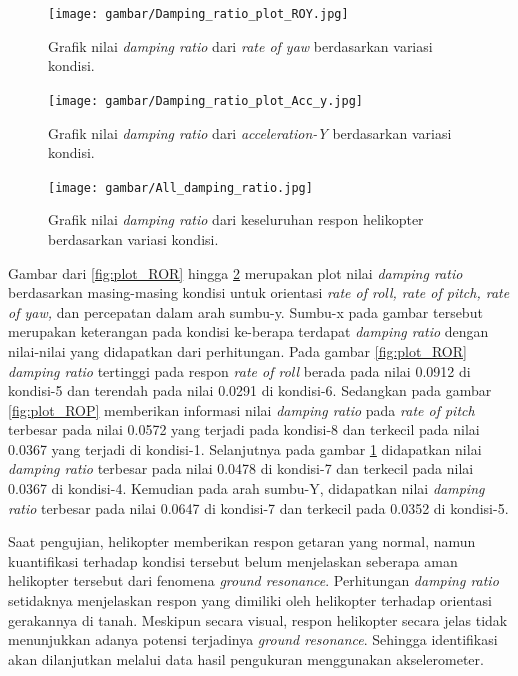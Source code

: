 \begin{figure}[h]
	\centering
	\texttt{[image: gambar/Damping\_ratio\_plot\_ROY.jpg]}
	\caption{Grafik nilai \textit{damping ratio} dari \textit{rate of yaw} berdasarkan variasi kondisi.}
	\label{fig:plot_ROY}
\end{figure}

\begin{figure}[h]
	\centering
	\texttt{[image: gambar/Damping\_ratio\_plot\_Acc\_y.jpg]}
	\caption{Grafik nilai \textit{damping ratio} dari \textit{acceleration-Y} berdasarkan variasi kondisi.}
	\label{fig:plot_Acc_Y}
\end{figure}

\begin{figure}[H]
	\centering
	\texttt{[image: gambar/All\_damping\_ratio.jpg]}
	\caption{Grafik nilai \textit{damping ratio} dari keseluruhan respon helikopter berdasarkan variasi kondisi.}
	\label{fig:plot_All}
\end{figure}

Gambar dari \ref{fig:plot_ROR} hingga \ref{fig:plot_Acc_Y} merupakan plot nilai \textit{damping ratio} berdasarkan masing-masing kondisi untuk orientasi \textit{rate of roll, rate of pitch, rate of yaw,} dan percepatan dalam arah sumbu-y. Sumbu-x pada gambar tersebut merupakan keterangan pada kondisi ke-berapa terdapat \textit{damping ratio} dengan nilai-nilai yang didapatkan dari perhitungan. Pada gambar \ref{fig:plot_ROR} \textit{damping ratio} tertinggi pada respon \textit{rate of roll} berada pada nilai 0.0912 di kondisi-5 dan terendah pada nilai 0.0291 di kondisi-6. Sedangkan pada gambar \ref{fig:plot_ROP} memberikan informasi nilai \textit{damping ratio} pada \textit{rate of pitch} terbesar pada nilai 0.0572 yang terjadi pada kondisi-8 dan terkecil pada nilai 0.0367 yang terjadi di kondisi-1. Selanjutnya pada gambar \ref{fig:plot_ROY} didapatkan nilai \textit{damping ratio} terbesar pada nilai 0.0478 di kondisi-7 dan terkecil pada nilai 0.0367 di kondisi-4. Kemudian pada arah sumbu-Y, didapatkan nilai \textit{damping ratio} terbesar pada nilai 0.0647 di kondisi-7 dan terkecil pada 0.0352 di kondisi-5.  

Saat pengujian, helikopter memberikan respon getaran yang normal, namun kuantifikasi terhadap kondisi tersebut belum menjelaskan seberapa aman helikopter tersebut dari fenomena \textit{ground resonance}. Perhitungan \textit{damping ratio} setidaknya menjelaskan respon yang dimiliki oleh helikopter terhadap orientasi gerakannya di tanah. Meskipun secara visual, respon helikopter secara jelas tidak menunjukkan adanya potensi terjadinya \textit{ground resonance}. Sehingga identifikasi akan dilanjutkan melalui data hasil pengukuran menggunakan akselerometer.

